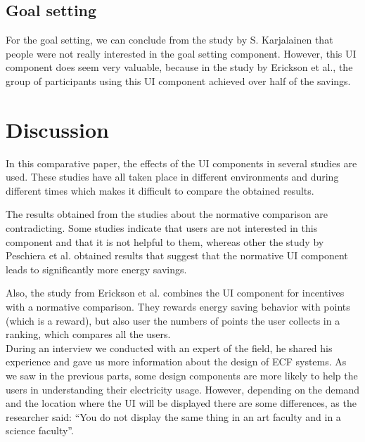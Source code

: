 \documentclass[journal]{vgtc}                %
\begin{document}

\subsection{Goal setting}
For the goal setting, we can conclude from the study by S. Karjalainen that people were not really interested in the goal setting component. However, this UI component does seem very valuable, because in the study by Erickson et al., the group of participants using this UI component achieved over half of the savings.


\section{Discussion}
In this comparative paper, the effects of the UI components in several studies are used. These studies have all taken place in different environments and during different times which makes it difficult to compare the obtained results.

The results obtained from the studies about the normative comparison are contradicting. Some studies indicate that users are not interested in this component and that it is not helpful to them, whereas other the study by Peschiera et al. obtained results that suggest that the normative UI component leads to significantly more energy savings.

Also, the study from Erickson et al. combines the UI component for incentives with a normative comparison. They rewards energy saving behavior with points (which is a reward), but also user the numbers of points the user collects in a ranking, which compares all the users.\\

During an interview we conducted with an expert of the field, he shared his experience and gave us more information about the design of ECF systems.
As we saw in the previous parts, some design components are more likely to help the users in understanding their electricity usage. However, depending on the demand and the location where the UI will be displayed there are some differences, as the researcher said: ``You do not display the same thing in an art faculty and in a science faculty''.
\end{document}
